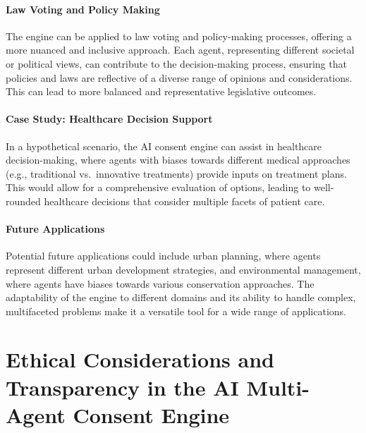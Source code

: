 \documentclass{article}
\begin{document}
\hypertarget{law-voting-and-policy-making}{%
\paragraph{Law Voting and Policy
Making}\label{law-voting-and-policy-making}}

The engine can be applied to law voting and policy-making processes,
offering a more nuanced and inclusive approach. Each agent, representing
different societal or political views, can contribute to the
decision-making process, ensuring that policies and laws are reflective
of a diverse range of opinions and considerations. This can lead to more
balanced and representative legislative outcomes.

\hypertarget{case-study-healthcare-decision-support}{%
\paragraph{Case Study: Healthcare Decision
Support}\label{case-study-healthcare-decision-support}}

In a hypothetical scenario, the AI consent engine can assist in
healthcare decision-making, where agents with biases towards different
medical approaches (e.g., traditional vs.~innovative treatments) provide
inputs on treatment plans. This would allow for a comprehensive
evaluation of options, leading to well-rounded healthcare decisions that
consider multiple facets of patient care.

\hypertarget{future-applications}{%
\paragraph{Future Applications}\label{future-applications}}

Potential future applications could include urban planning, where agents
represent different urban development strategies, and environmental
management, where agents have biases towards various conservation
approaches. The adaptability of the engine to different domains and its
ability to handle complex, multifaceted problems make it a versatile
tool for a wide range of applications.

\hypertarget{ethical-considerations-and-transparency-in-the-ai-multi-agent-consent-engine}{%
\section*{Ethical Considerations and Transparency in the AI
Multi-Agent Consent
Engine}\label{ethical-considerations-and-transparency-in-the-ai-multi-agent-consent-engine}}
\end{document}
